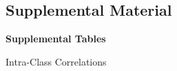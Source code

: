 \documentclass[
  english,
  man, noextraspace]{apa7}
\begin{document}
\begin{appendix}
\renewcommand{\appendixname}{\textcolor{white}{.}}
\renewcommand{\thefigure}{S\arabic{figure}} \setcounter{figure}{0}
\renewcommand{\thetable}{S\arabic{table}} \setcounter{table}{0}

\setcounter{page}{1}

\hypertarget{supplemental-material}{%
\section{Supplemental Material}\label{supplemental-material}}

\noindent \textbf{Supplemental Tables}

\begin{table}[h]

\begin{center}
\begin{threeparttable}

\caption{\label{tab:icc-table}Intra-Class Correlations}


\end{threeparttable}
\end{center}
\end{table}
\end{appendix}
\end{document}
